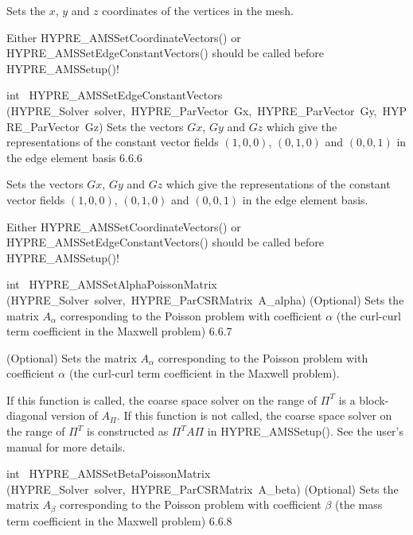 \documentclass{article}
\begin{document}
\begin{cxxentry}
\begin{cxxentry}
\begin{cxxfunction}
\begin{cxxdoc}
Sets the $x$, $y$ and $z$ coordinates of the vertices in the mesh.

Either HYPRE\_AMSSetCoordinateVectors() or HYPRE\_AMSSetEdgeConstantVectors()
should be called before HYPRE\_AMSSetup()!
\end{cxxdoc}
\end{cxxfunction}
\begin{cxxfunction}
{int\ }
        {HYPRE\_AMSSetEdgeConstantVectors}
        {(HYPRE\_Solver\ solver,\ HYPRE\_ParVector\ Gx,\ HYPRE\_ParVector\ Gy,\ HYPRE\_ParVector\ Gz)}
        {
Sets the vectors $Gx$, $Gy$ and $Gz$ which give the representations of
the constant vector fields $(1,0,0)$, $(0,1,0)$ and $(0,0,1)$ in the
edge element basis}
        {6.6.6}
\begin{cxxdoc}

Sets the vectors $Gx$, $Gy$ and $Gz$ which give the representations of
the constant vector fields $(1,0,0)$, $(0,1,0)$ and $(0,0,1)$ in the
edge element basis.

Either HYPRE\_AMSSetCoordinateVectors() or HYPRE\_AMSSetEdgeConstantVectors()
should be called before HYPRE\_AMSSetup()!
\end{cxxdoc}
\end{cxxfunction}
\begin{cxxfunction}
{int\ }
        {HYPRE\_AMSSetAlphaPoissonMatrix}
        {(HYPRE\_Solver\ solver,\ HYPRE\_ParCSRMatrix\ A\_alpha)}
        {
(Optional) Sets the matrix $A_\alpha$ corresponding to the Poisson
problem with coefficient $\alpha$ (the curl-curl term coefficient in
the Maxwell problem)}
        {6.6.7}
\begin{cxxdoc}

(Optional) Sets the matrix $A_\alpha$ corresponding to the Poisson
problem with coefficient $\alpha$ (the curl-curl term coefficient in
the Maxwell problem).

If this function is called, the coarse space solver on the range
of $\Pi^T$ is a block-diagonal version of $A_\Pi$. If this function is not
called, the coarse space solver on the range of $\Pi^T$ is constructed
as $\Pi^T A \Pi$ in HYPRE\_AMSSetup(). See the user's manual for more details.
\end{cxxdoc}
\end{cxxfunction}
\begin{cxxfunction}
{int\ }
        {HYPRE\_AMSSetBetaPoissonMatrix}
        {(HYPRE\_Solver\ solver,\ HYPRE\_ParCSRMatrix\ A\_beta)}
        {
(Optional) Sets the matrix $A_\beta$ corresponding to the Poisson
problem with coefficient $\beta$ (the mass term coefficient in the
Maxwell problem)}
        {6.6.8}
\begin{cxxdoc}


\end{cxxdoc}
\end{cxxfunction}
\end{cxxentry}
\end{cxxentry}
\end{document}
